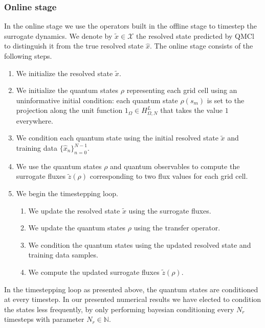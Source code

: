 \documentclass[letterpaper,10pt,3p,preprint]{elsarticle}
\newcommand{\Nbb}{\mathbb{N}}
\newcommand{\Xcal}{\mathcal{X}}
\begin{document}
\subsubsection*{Online stage}
In the online stage we use the operators built in the offline stage
to timestep the surrogate dynamics.
We denote by $\tilde{x}\in\Xcal$
the resolved state predicted by QMCl to distinguish it
from the true resolved state $\hat{x}$.
The online stage consists of the following steps.
\begin{enumerate}
\item We initialize the resolved state $\tilde{x}$.
\item We initialize the quantum states $\rho$
representing each grid cell using an uninformative initial condition:
each quantum state $\rho(s_m)$ is set to the projection along the
unit function $1_\Omega\in H_{\Omega,N}^L$
that takes the value $1$ everywhere.
\item We condition each quantum state using the initial resolved state
$\tilde{x}$ and training data $\{\hat{x}_n\}_{n=0}^{N-1}$.
\item We use the quantum states $\rho$ and quantum observables
to compute the surrogate fluxes $\tilde{z}(\rho)$
corresponding to two flux values for each grid cell.
\item We begin the timestepping loop.
\begin{enumerate}
\item We update the resolved state $\tilde{x}$
using the surrogate fluxes.
\item We update the quantum states $\rho$ using the transfer operator.
\item We condition the quantum states using the updated resolved
state and training data samples.
\item We compute the updated surrogate fluxes $\tilde{z}(\rho)$.
\end{enumerate}
\end{enumerate}

In the timestepping loop as presented above, the quantum states
are conditioned at every timestep.
In our presented numerical results we have elected
to condition the states less frequently, by only performing
bayesian conditioning every $N_r$ timesteps with
parameter $N_r\in\Nbb$.



\end{document}
